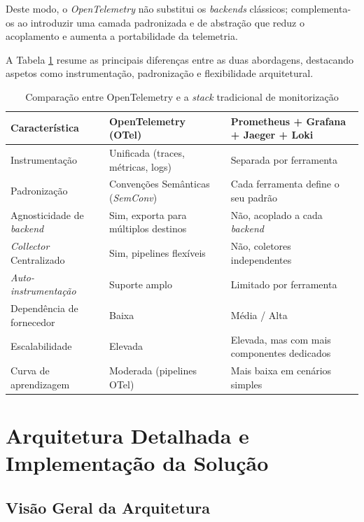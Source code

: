 Deste modo, o \textit{OpenTelemetry} não substitui os \textit{backends} clássicos; complementa-os ao introduzir uma camada padronizada e de abstração que reduz o acoplamento e aumenta a portabilidade da telemetria.

A Tabela \ref{tab:otel_vs_tradicional} resume as principais diferenças entre as duas abordagens, destacando aspetos como instrumentação, padronização e flexibilidade arquitetural.

\begin{table}[h!]
\centering
\caption{Comparação entre OpenTelemetry e a \textit{stack} tradicional de monitorização}
\label{tab:otel_vs_tradicional}
\begin{tabular}{|p{4cm}|p{5cm}|p{5cm}|}
\hline
\textbf{Característica} & \textbf{OpenTelemetry (OTel)} & \textbf{Prometheus + Grafana + Jaeger + Loki} \\ \hline

Instrumentação & Unificada (traces, métricas, logs) & Separada por ferramenta \\ \hline
Padronização & Convenções Semânticas (\textit{SemConv}) & Cada ferramenta define o seu padrão \\ \hline
Agnosticidade de \textit{backend} & Sim, exporta para múltiplos destinos & Não, acoplado a cada \textit{backend} \\ \hline
\textit{Collector} Centralizado & Sim, pipelines flexíveis & Não, coletores independentes \\ \hline
\textit{Auto-instrumentação} & Suporte amplo & Limitado por ferramenta \\ \hline
Dependência de fornecedor & Baixa & Média / Alta \\ \hline
Escalabilidade & Elevada & Elevada, mas com mais componentes dedicados \\ \hline
Curva de aprendizagem & Moderada (pipelines OTel) & Mais baixa em cenários simples \\ \hline

\end{tabular}
\end{table}

\clearpage

\section{Arquitetura Detalhada e Implementação da Solução}

\subsection{Visão Geral da Arquitetura}

